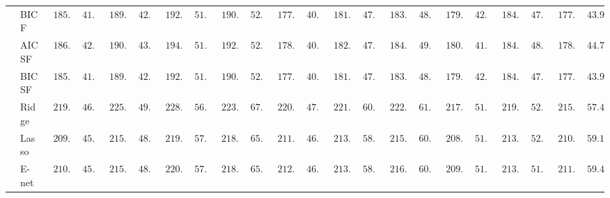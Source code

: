 \begin{tabular}{p{0.2cm}p{1cm}|p{0.6cm}p{0.6cm}|p{0.6cm}p{0.6cm}p{0.6cm}p{0.6cm}p{0.6cm}p{0.6cm}|p{0.6cm}p{0.6cm}p{0.6cm}p{0.6cm}p{0.6cm}p{0.6cm}|p{0.6cm}p{0.6cm}p{0.6cm}p{0.6cm}p{0.6cm}p{0.6cm}}
 & BIC F  & $\phantom{0}185.38$ & $\phantom{0}41.95$ & $\phantom{0}189.04$ & $\phantom{0}42.80$ & $\phantom{0}192.16$ & $\phantom{0}51.72$ & $\phantom{0}190.20$ & $\phantom{0}52.45$ & $\phantom{0}177.76$ & $\phantom{0}40.38$ & $\phantom{0}181.31$ & $\phantom{0}47.75$ & $\phantom{0}183.49$ & $\phantom{0}48.48$ & $\phantom{0}179.60$ & $\phantom{0}42.60$ & $\phantom{0}184.08$ & $\phantom{0}47.54$ & $\phantom{0}177.65$ & $\phantom{0}43.94$ \\
 & AIC SF  & $\phantom{0}186.31$ & $\phantom{0}42.89$ & $\phantom{0}190.75$ & $\phantom{0}43.32$ & $\phantom{0}194.40$ & $\phantom{0}51.64$ & $\phantom{0}192.09$ & $\phantom{0}52.27$ & $\phantom{0}178.65$ & $\phantom{0}40.04$ & $\phantom{0}182.44$ & $\phantom{0}47.39$ & $\phantom{0}184.56$ & $\phantom{0}49.57$ & $\phantom{0}180.37$ & $\phantom{0}41.31$ & $\phantom{0}184.19$ & $\phantom{0}48.00$ & $\phantom{0}178.54$ & $\phantom{0}44.71$ \\
 & BIC SF  & $\phantom{0}185.38$ & $\phantom{0}41.95$ & $\phantom{0}189.04$ & $\phantom{0}42.80$ & $\phantom{0}192.16$ & $\phantom{0}51.72$ & $\phantom{0}190.20$ & $\phantom{0}52.45$ & $\phantom{0}177.76$ & $\phantom{0}40.38$ & $\phantom{0}181.35$ & $\phantom{0}47.71$ & $\phantom{0}183.46$ & $\phantom{0}48.50$ & $\phantom{0}179.60$ & $\phantom{0}42.60$ & $\phantom{0}184.08$ & $\phantom{0}47.54$ & $\phantom{0}177.62$ & $\phantom{0}43.97$ \\
 & Ridge  & $\phantom{0}219.63$ & $\phantom{0}46.06$ & $\phantom{0}225.25$ & $\phantom{0}49.90$ & $\phantom{0}228.86$ & $\phantom{0}56.31$ & $\phantom{0}223.26$ & $\phantom{0}67.66$ & $\phantom{0}220.25$ & $\phantom{0}47.96$ & $\phantom{0}221.13$ & $\phantom{0}60.63$ & $\phantom{0}222.01$ & $\phantom{0}61.44$ & $\phantom{0}217.63$ & $\phantom{0}51.45$ & $\phantom{0}219.68$ & $\phantom{0}52.47$ & $\phantom{0}215.48$ & $\phantom{0}57.48$ \\
 & Lasso  & $\phantom{0}209.98$ & $\phantom{0}45.23$ & $\phantom{0}215.02$ & $\phantom{0}48.24$ & $\phantom{0}219.94$ & $\phantom{0}57.03$ & $\phantom{0}218.19$ & $\phantom{0}65.89$ & $\phantom{0}211.81$ & $\phantom{0}46.35$ & $\phantom{0}213.58$ & $\phantom{0}58.13$ & $\phantom{0}215.59$ & $\phantom{0}60.20$ & $\phantom{0}208.58$ & $\phantom{0}51.04$ & $\phantom{0}213.19$ & $\phantom{0}52.02$ & $\phantom{0}210.28$ & $\phantom{0}59.13$ \\
 & E-net  & $\phantom{0}210.73$ & $\phantom{0}45.58$ & $\phantom{0}215.76$ & $\phantom{0}48.53$ & $\phantom{0}220.48$ & $\phantom{0}57.72$ & $\phantom{0}218.03$ & $\phantom{0}65.53$ & $\phantom{0}212.25$ & $\phantom{0}46.78$ & $\phantom{0}213.85$ & $\phantom{0}58.10$ & $\phantom{0}216.11$ & $\phantom{0}60.55$ & $\phantom{0}209.22$ & $\phantom{0}51.32$ & $\phantom{0}213.95$ & $\phantom{0}51.95$ & $\phantom{0}211.06$ & $\phantom{0}59.45$ \\

\end{tabular}
